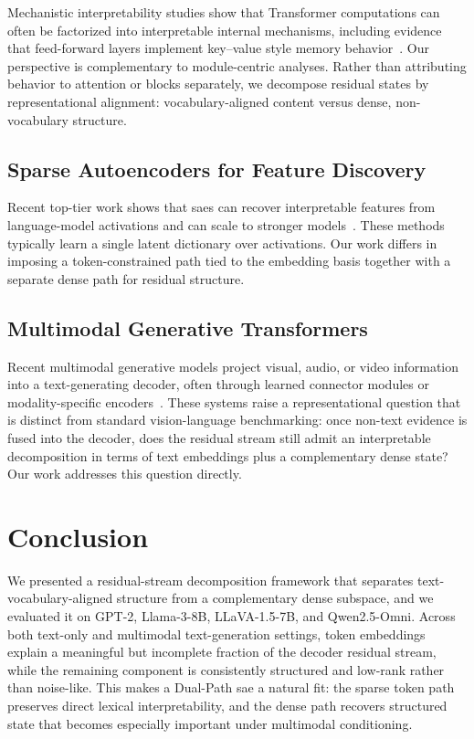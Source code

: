 \documentclass{article}
\begin{document}
Mechanistic interpretability studies show that Transformer computations can often be factorized into interpretable internal mechanisms, including evidence that feed-forward layers implement key--value style memory behavior~\cite{gevaTransformerFeedForwardLayers2021}. Our perspective is complementary to module-centric analyses. Rather than attributing behavior to attention or  blocks separately, we decompose residual states by representational alignment: vocabulary-aligned content versus dense, non-vocabulary structure.

\subsection{Sparse Autoencoders for Feature Discovery}

Recent top-tier work shows that \glspl{sae} can recover interpretable features from language-model activations and can scale to stronger models~\cite{hubenSparseAutoencodersFind2023,gaoScalingEvaluatingSparse2024,marksSparseFeatureCircuits2024}. These methods typically learn a single latent dictionary over activations. Our work differs in imposing a token-constrained path tied to the embedding basis together with a separate dense path for residual structure.

\subsection{Multimodal Generative Transformers}

Recent multimodal generative models project visual, audio, or video information into a text-generating decoder, often through learned connector modules or modality-specific encoders~\cite{liuImprovedBaselinesVisual2024,xuQwen25OmniTechnicalReport2025,xuMultimodalLearningTransformers2023}. These systems raise a representational question that is distinct from standard vision-language benchmarking: once non-text evidence is fused into the decoder, does the residual stream still admit an interpretable decomposition in terms of text embeddings plus a complementary dense state? Our work addresses this question directly.




\section{Conclusion}

We presented a residual-stream decomposition framework that separates text-vocabulary-aligned structure from a complementary dense subspace, and we evaluated it on GPT-2, Llama-3-8B, LLaVA-1.5-7B, and Qwen2.5-Omni. Across both text-only and multimodal text-generation settings, token embeddings explain a meaningful but incomplete fraction of the decoder residual stream, while the remaining component is consistently structured and low-rank rather than noise-like. This makes a Dual-Path \gls{sae} a natural fit: the sparse token path preserves direct lexical interpretability, and the dense path recovers structured state that becomes especially important under multimodal conditioning.
\end{document}
